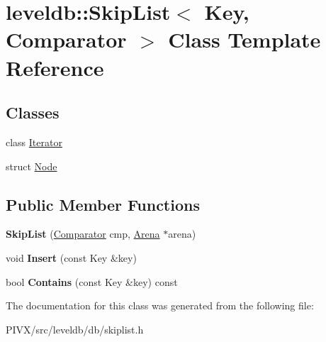 \hypertarget{classleveldb_1_1_skip_list}{}\section{leveldb\+:\+:Skip\+List$<$ Key, Comparator $>$ Class Template Reference}
\label{classleveldb_1_1_skip_list}
\subsection*{Classes}
\begin{DoxyCompactItemize}
\item 
class \mbox{\hyperlink{classleveldb_1_1_skip_list_1_1_iterator}{Iterator}}
\item 
struct \mbox{\hyperlink{structleveldb_1_1_skip_list_1_1_node}{Node}}
\end{DoxyCompactItemize}
\subsection*{Public Member Functions}
\begin{DoxyCompactItemize}
\item 
\mbox{\label{classleveldb_1_1_skip_list_a793060fb1b44b01c6f510aa16387c6ee}} 
{\bfseries Skip\+List} (\mbox{\hyperlink{structleveldb_1_1_comparator}{Comparator}} cmp, \mbox{\hyperlink{classleveldb_1_1_arena}{Arena}} $\ast$arena)
\item 
\mbox{\label{classleveldb_1_1_skip_list_af1ed755f0825f38272aafe3cae4da644}} 
void {\bfseries Insert} (const Key \&key)
\item 
\mbox{\label{classleveldb_1_1_skip_list_a689b9724beb6c224c01cf1b9d8699e16}} 
bool {\bfseries Contains} (const Key \&key) const
\end{DoxyCompactItemize}


The documentation for this class was generated from the following file\+:\begin{DoxyCompactItemize}
\item 
P\+I\+V\+X/src/leveldb/db/skiplist.\+h\end{DoxyCompactItemize}

